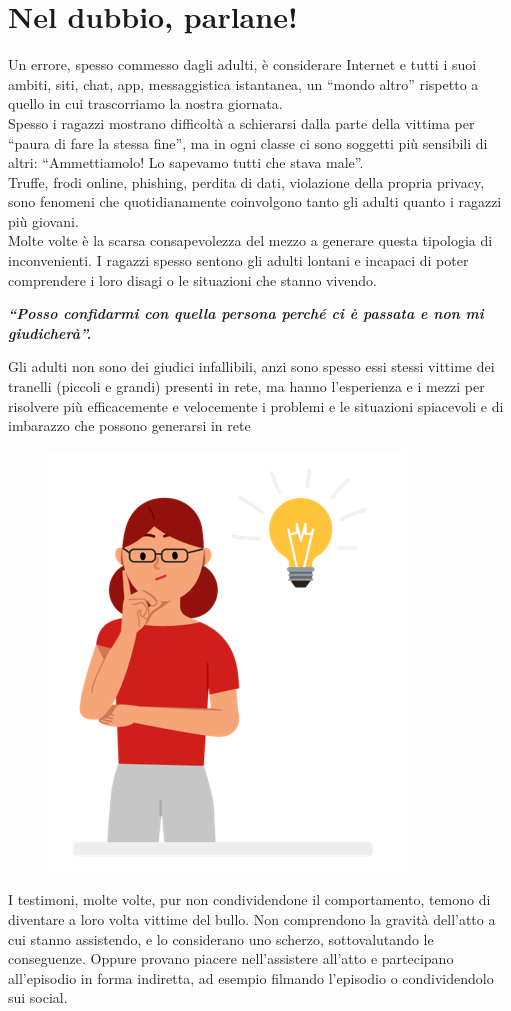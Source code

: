 \documentclass{article}
\begin{document}
\section{Nel dubbio, parlane!}
Un errore, spesso commesso dagli adulti, è considerare Internet e tutti i suoi ambiti, siti, chat, app, messaggistica istantanea, un “mondo altro” rispetto a quello in cui trascorriamo la nostra giornata.\\
Spesso i ragazzi mostrano difficoltà a schierarsi dalla parte della vittima per “paura di fare la stessa fine”, ma in ogni classe ci sono soggetti più sensibili di altri: “Ammettiamolo! Lo sapevamo tutti che stava male”.\\
Truffe, frodi online, phishing, perdita di dati, violazione della propria privacy, sono fenomeni che quotidianamente coinvolgono tanto gli adulti quanto i ragazzi più giovani.\\
Molte volte è la scarsa consapevolezza del mezzo a generare questa tipologia di inconvenienti. I ragazzi spesso sentono gli adulti lontani e incapaci di poter comprendere i loro disagi o le situazioni che stanno vivendo.\\
\begin{center}
	\begin{large}
		\textbf{\textit{“Posso confidarmi con quella persona perché ci è passata e non mi giudicherà”.
		}}
	\end{large}
\end{center}
Gli adulti non sono dei giudici infallibili, anzi sono spesso essi stessi vittime dei tranelli (piccoli e grandi) presenti in rete, ma hanno l’esperienza e i mezzi per risolvere più efficacemente e velocemente i problemi e le situazioni spiacevoli e di imbarazzo che possono generarsi in rete
\begin{figure}[h!]
	\centering
	\includegraphics[scale=0.5]{adults1.png}
\end{figure}
I testimoni, molte volte, pur non condividendone il comportamento, temono di diventare a loro volta vittime del bullo. Non comprendono la gravità dell’atto a cui stanno assistendo, e lo considerano uno scherzo, sottovalutando le conseguenze. Oppure provano piacere nell’assistere all’atto e partecipano all’episodio in forma indiretta, ad esempio filmando l’episodio o condividendolo sui social.
\end{document}
